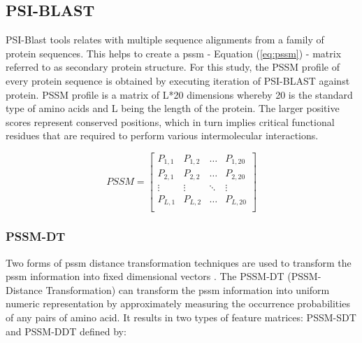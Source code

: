   \subsection{PSI-BLAST}
  PSI-Blast tools relates with multiple sequence alignments from a family of protein sequences\cite{Schaffer2001}. This helps to create a \acrshort{pssm} - Equation (\ref{eq:pssm}) - matrix referred to as secondary protein structure. For this study, the PSSM profile of every protein sequence is obtained by executing iteration of PSI-BLAST against \cite[KEGG]{Schaffer2001} protein. PSSM profile is a matrix of L*20 dimensions whereby 20 is the standard type of amino acids and L being the length of the protein. The larger positive scores represent conserved positions, which in turn implies critical functional residues that are required to perform various intermolecular interactions.\cite[PSSM]{Schaffer2001}
  
  \begin{equation}
    PSSM = \begin{bmatrix}
      P_{1,1} & P_{1,2} & \dots & P_{1,20} \\
      P_{2,1} & P_{2,2} & \dots & P_{2,20} \\
      \vdots  & \vdots  & \ddots & \vdots \\
      P_{L,1} & P_{L,2} & \dots & P_{L,20} \\
    \end{bmatrix}
    \label{eq:pssm}
  \end{equation}
  
  \subsubsection{PSSM-DT}
  Two forms of \acrshort{pssm} distance transformation techniques are used to transform the \acrshort{pssm} information into fixed dimensional vectors \cite{Xu2015}. The PSSM-DT (PSSM-Distance Transformation) can transform the \acrshort{pssm} information into uniform numeric representation by approximately measuring the occurrence probabilities of any pairs of amino acid. It results in two types of feature matrices: PSSM-SDT and PSSM-DDT defined by:
  
